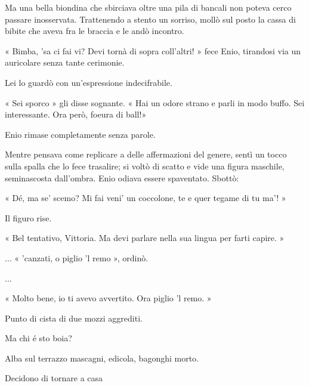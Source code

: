 Ma una bella biondina che sbirciava oltre una pila di bancali non poteva cerco passare inosservata. Trattenendo a stento un sorriso, mollò sul posto la cassa di bibite che aveva fra le braccia e le andò incontro.

« Bimba, 'sa ci fai vi? Devi tornà di sopra coll'altri! » fece Enio, tirandosi via un auricolare senza tante cerimonie.

Lei lo guardò con un'espressione indecifrabile.

« Sei sporco » gli disse sognante. « Hai un odore strano e parli in modo buffo. Sei interessante. Ora però, foeura di ball!»

Enio rimase completamente senza parole. 

Mentre pensava come replicare a delle affermazioni del genere, sentì un tocco sulla spalla che lo fece trasalire; si voltò di scatto e vide una figura maschile, seminascosta dall'ombra. Enio odiava essere spaventato. Sbottò:

« Dé, ma se' scemo? Mi fai veni' un coccolone, te e quer tegame di tu ma'! »

Il figuro rise. 

« Bel tentativo, Vittoria. Ma devi parlare nella sua lingua per farti capire. »

... « 'canzati, o piglio 'l remo », ordinò.

...

« Molto bene, io ti avevo avvertito. Ora piglio 'l remo. »

Punto di cista di due mozzi aggrediti.

Ma chi é sto boia?

Alba sul terrazzo mascagni, edicola, bagonghi morto.

Decidono di tornare a casa

